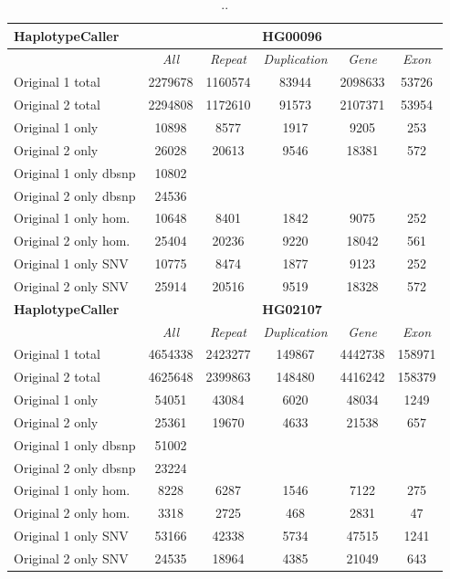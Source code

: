 \begin{table}[htb]
\begin{center}
\begin{tabular}{|l|c||c|c|c|c|}
\hline
{\bf HaplotypeCaller} & \multicolumn{5}{|c|}{\bf HG00096} \\
\hline
\cline{2-6}
{\bf} & {\it All} & {\it Repeat} & {\it Duplication} & {\it Gene} & {\it Exon} \\
\hline
Original 1 total & 2279678 & 1160574 & 83944 & 2098633 & 53726\\ 
\hline
Original 2 total & 2294808 & 1172610 & 91573 & 2107371 & 53954\\ 
\hline
Original 1 only & 10898 & 8577 & 1917 & 9205 & 253\\ 
\hline
Original 2 only & 26028 & 20613 & 9546 & 18381 & 572\\ 
\hline
Original 1 only dbsnp & 10802 &  &  &  & \\ 
\hline
Original 2 only dbsnp & 24536 &  &  &  & \\ 
\hline
Original 1 only hom. & 10648 & 8401 & 1842 & 9075 & 252\\ 
\hline
Original 2 only hom. & 25404 & 20236 & 9220 & 18042 & 561\\ 
\hline
Original 1 only SNV & 10775 & 8474 & 1877 & 9123 & 252\\ 
\hline
Original 2 only SNV & 25914 & 20516 & 9519 & 18328 & 572\\ 
\hline
\hline
{\bf HaplotypeCaller} & \multicolumn{5}{|c|}{\bf HG02107} \\
\hline
\cline{2-6}
{\bf} & {\it All} & {\it Repeat} & {\it Duplication} & {\it Gene} & {\it Exon} \\
\hline
Original 1 total & 4654338 & 2423277 & 149867 & 4442738 & 158971\\ 
\hline
Original 2 total & 4625648 & 2399863 & 148480 & 4416242 & 158379\\ 
\hline
Original 1 only & 54051 & 43084 & 6020 & 48034 & 1249\\ 
\hline
Original 2 only & 25361 & 19670 & 4633 & 21538 & 657\\ 
\hline
Original 1 only dbsnp & 51002 &  &  &  & \\ 
\hline
Original 2 only dbsnp & 23224 &  &  &  & \\ 
\hline
Original 1 only hom. & 8228 & 6287 & 1546 & 7122 & 275\\ 
\hline
Original 2 only hom. & 3318 & 2725 & 468 & 2831 & 47\\ 
\hline
Original 1 only SNV & 53166 & 42338 & 5734 & 47515 & 1241\\ 
\hline
Original 2 only SNV & 24535 & 18964 & 4385 & 21049 & 643\\ 
\hline 
\end{tabular}
\end{center}
\caption{ .. }
\label{tab:orig-vs-shuf-hc}
\end{table}




